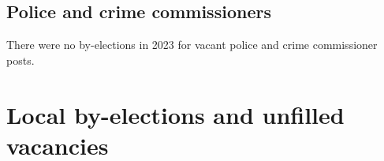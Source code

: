 \documentclass[a4paper,openany]{book}
\begin{document}
\section{Police and crime commissioners}

There were no by-elections in 2023 for vacant police and crime commissioner posts.

%
%
%
%

\chapter{Local by-elections and unfilled vacancies}
\end{document}
